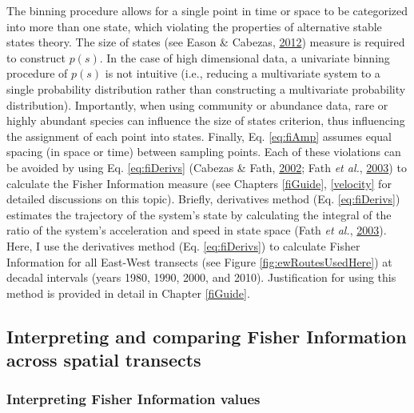 \documentclass[print]{nuthesis}
\begin{document}
The binning procedure allows for a single point in time or space to be categorized into more than one state, which violating the properties of alternative stable states theory. The size of states (see Eason \& Cabezas, \protect\hyperlink{ref-eason_evaluating_2012}{2012}) measure is required to construct \(p(s)\). In the case of high dimensional data, a univariate binning procedure of \(p(s)\) is not intuitive (i.e., reducing a multivariate system to a single probability distribution rather than constructing a multivariate probability distribution). Importantly, when using community or abundance data, rare or highly abundant species can influence the size of states criterion, thus influencing the assignment of each point into states. Finally, Eq. \eqref{eq:fiAmp} assumes equal spacing (in space or time) between sampling points. Each of these violations can be avoided by using Eq. \eqref{eq:fiDerivs} (Cabezas \& Fath, \protect\hyperlink{ref-cabezas_towards_2002}{2002}; Fath \emph{et al.}, \protect\hyperlink{ref-fath_regime_2003}{2003}) to calculate the Fisher Information measure (see Chapters \ref{fiGuide}, \ref{velocity} for detailed discussions on this topic). Briefly, derivatives method (Eq. \eqref{eq:fiDerivs}) estimates the trajectory of the system's state by calculating the integral of the ratio of the system's acceleration and speed in state space (Fath \emph{et al.}, \protect\hyperlink{ref-fath_regime_2003}{2003}). Here, I use the derivatives method (Eq. \eqref{eq:fiDerivs}) to calculate Fisher Information for all East-West transects (see Figure \ref{fig:ewRoutesUsedHere}) at decadal intervals (years 1980, 1990, 2000, and 2010). Justification for using this method is provided in detail in Chapter \ref{fiGuide}.

\hypertarget{interpreting-and-comparing-fisher-information-across-spatial-transects}{%
\subsection{Interpreting and comparing Fisher Information across spatial transects}\label{interpreting-and-comparing-fisher-information-across-spatial-transects}}

\hypertarget{interpreting-fisher-information-values}{%
\subsubsection{Interpreting Fisher Information values}\label{interpreting-fisher-information-values}}
\end{document}

